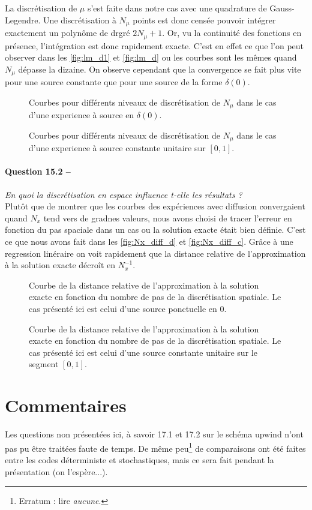 \documentclass[11pt,a4paper]{article}
\newcommand{\question}[2]{\paragraph{Question #1 --}\hspace{-7pt}\textit{#2} \\}
\begin{document}
La discrétisation de $\mu$ s'est faite dans notre cas avec une quadrature de Gauss-Legendre. Une discrétisation à $N_\mu$ points est donc censée pouvoir intégrer exactement un polynôme de drgré $2N_\mu+1$. Or, vu la continuité des fonctions en présence, l'intégration est donc rapidement exacte. C'est en effet ce que l'on peut observer dans les \autoref{fig:lm_d1} et \autoref{fig:lm_d} ou les courbes sont les mêmes quand $N_\mu$ dépasse la dizaine. On observe cependant que la convergence se fait plus vite pour une source constante que pour une source de la forme $\delta(0)$.
\begin{figure}
  \centering
  
  \caption{Courbes pour différents niveaux de discrétisation de $N_\mu$ dans le cas d'une experience à source en $\delta(0)$.}
  \label{fig:lm_d1}
\end{figure}

\begin{figure}
  \centering
  
  \caption{Courbes pour différents niveaux de discrétisation de $N_\mu$ dans le cas d'une experience à source constante unitaire sur $[0,1]$.}
  \label{fig:lm_d}
\end{figure}



\question{15.2}{En quoi la discrétisation en espace influence t-elle les résultats ?}

Plutôt que de montrer que les courbes des expériences avec diffusion convergaient quand $N_x$ tend vers de gradnes valeurs, nous avons choisi de tracer l'erreur en fonction du pas spaciale dans un cas ou la solution exacte était bien définie. C'est ce que nous avons fait dans les \autoref{fig:Nx_diff_d} et \autoref{fig:Nx_diff_c}. Grâce à une regression linéraire on voit rapidement que la distance relative de l'approximation à la solution exacte décroît en $N_x^{-1}$.

\begin{figure}
  \centering
  
  \caption{Courbe de la distance relative de l'approximation à la solution exacte en fonction du nombre de pas de la discrétisation spatiale. Le cas présenté ici est celui d'une source ponctuelle en 0.}
  \label{fig:Nx_diff_d}
\end{figure}

\begin{figure}
  \centering
  
  \caption{Courbe de la distance relative de l'approximation à la solution exacte en fonction du nombre de pas de la discrétisation spatiale. Le cas présenté ici est celui d'une source constante unitaire sur le segment $[0,1]$.}
  \label{fig:Nx_diff_c}
\end{figure}




\section{Commentaires}
Les questions non présentées ici, à savoir 17.1 et 17.2 sur le schéma upwind n'ont pas pu être traitées faute de temps. De même peu\footnote{Erratum : lire \emph{aucune}.} de comparaisons ont été faites entre les codes déterministe et stochastiques, mais ce sera fait pendant la présentation (on l'espère...).
\end{document}
